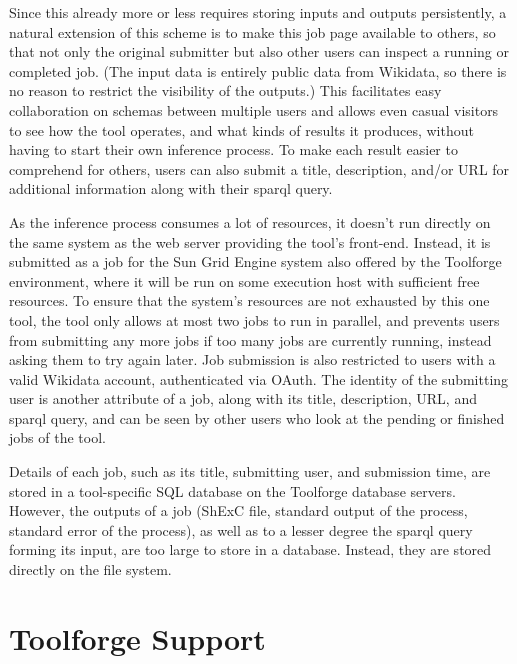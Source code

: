 Since this already more or less requires storing inputs and outputs persistently,
a natural extension of this scheme is to make this job page available to others,
so that not only the original submitter but also other users can inspect a running or completed job.
(The input data is entirely public data from Wikidata,
so there is no reason to restrict the visibility of the outputs.)
This facilitates easy collaboration on schemas between multiple users
and allows even casual visitors to see how the tool operates,
and what kinds of results it produces,
without having to start their own inference process.
To make each result easier to comprehend for others,
users can also submit a title, description, and/or URL for additional information
along with their \gls{sparql} query. %

As the inference process consumes a lot of resources,
it doesn’t run directly on the same system as the web server providing the tool’s front-end.
Instead, it is submitted as a job for the Sun Grid Engine system also offered by the Toolforge environment,
where it will be run on some execution host with sufficient free resources.
To ensure that the system’s resources are not exhausted by this one tool,
the tool only allows at most two jobs to run in parallel,
and prevents users from submitting any more jobs if too many jobs are currently running,
instead asking them to try again later.
Job submission is also restricted to users with a valid Wikidata account,
authenticated via OAuth.
The identity of the submitting user is another attribute of a job,
along with its title, description, URL, and \gls{sparql} query,
and can be seen by other users who look at the pending or finished jobs of the tool.

Details of each job,
such as its title, submitting user, and submission time,
are stored in a tool-specific SQL database on the Toolforge database servers.
However, the outputs of a job
(ShExC file, standard output of the process, standard error of the process),
as well as to a lesser degree the \gls{sparql} query forming its input,
are too large to store in a database.
Instead, they are stored directly on the file system.

\section{Toolforge Support}
\label{sec:wdsi:Toolforge}

